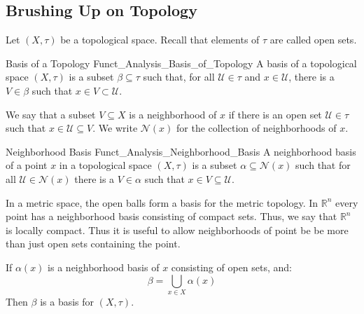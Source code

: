 \documentclass[crop=false,class=book,oneside]{standalone}                      %
\begin{document}
        \subsection{Brushing Up on Topology}
            Let $(X,\tau)$ be a topological space. Recall that
            elements of $\tau$ are called open sets.
            \begin{ldefinition}{Basis of a Topology}
                  {Funct_Analysis_Basis_of_Topology}
                A basis of a topological space $(X,\tau)$ is a
                subset $\beta\subseteq\tau$ such that, for all
                $\mathcal{U}\in\tau$ and $x\in\mathcal{U}$, there
                is a $V\in\beta$ such that
                $x\in{V}\subset\mathcal{U}$.
            \end{ldefinition}
            We say that a subset $V\subseteq{X}$ is a neighborhood
            of $x$ if there is an open set
            $\mathcal{U}\in\tau$ such that
            $x\in\mathcal{U}\subseteq{V}$. We write
            $\mathscr{N}(x)$ for the collection of neighborhoods
            of $x$.
            \begin{ldefinition}{Neighborhood Basis}
                  {Funct_Analysis_Neighborhood_Basis}
                A neighborhood basis of a point $x$ in a topological
                space $(X,\tau)$ is a subset
                $\alpha\subseteq\mathscr{N}(x)$ such that
                for all $\mathcal{U}\in\mathscr{N}(x)$ there is
                a $V\in\alpha$ such that
                $x\in{V}\subseteq\mathcal{U}$.
            \end{ldefinition}
            \begin{lexample}
                In a metric space, the open balls form
                a basis for the metric topology. In $\mathbb{R}^{n}$
                every point has a neighborhood basis consisting of
                compact sets. Thus, we say that $\mathbb{R}^{n}$
                is locally compact. Thus it is useful to allow
                neighborhoods of point be be more than just open
                sets containing the point.
            \end{lexample}
            \begin{theorem}
                If $\alpha(x)$ is a neighborhood basis of
                $x$ consisting of open sets, and:
                \begin{equation}
                    \beta=\bigcup_{x\in{X}}\alpha(x)
                \end{equation}
                Then $\beta$ is a basis for $(X,\tau)$.
            \end{theorem}
\end{document}
